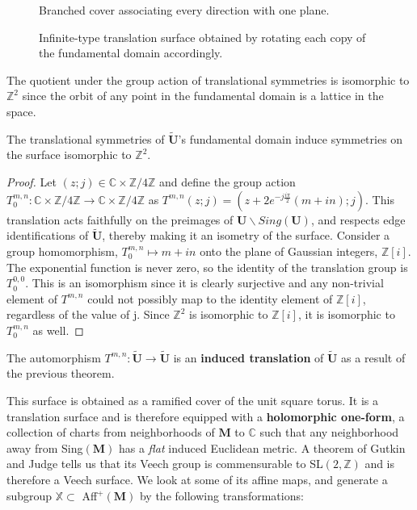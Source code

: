 \documentclass[]{article}
\begin{document}
\begin{figure}[H]
\centering

\label{fig:utilda0}
\caption{Branched cover associating every direction with one plane.}
\end{figure}

\begin{figure}[H]
\centering

\caption{Infinite-type translation surface obtained by rotating each copy of the fundamental domain accordingly.}
\label{fig:utilda}
\end{figure}

The quotient under the group action of translational symmetries is isomorphic to $\mathbb{Z}^2$ since the orbit of any point in the fundamental domain is a lattice in the space. 

\begin{thm}
The translational symmetries of $\tilde{\mathbf{U}}$'s fundamental domain induce symmetries on the surface isomorphic to $\mathbb{Z}^2$.
\begin{proof}
Let $(z;j)\in\mathbb{C}\times\mathbb{Z}/4\mathbb{Z}$ and define the group action $T_0^{m,n}:\mathbb{C}\times\mathbb{Z}/4\mathbb{Z}\rightarrow\mathbb{C}\times\mathbb{Z}/4\mathbb{Z}$ as $T^{m,n}(z;j)=(z+2e^{-j\frac{i\pi}{2}}(m+in);j)$. This translation acts faithfully on the preimages of $\mathbf{U}\backslash Sing(\mathbf{U})$, and respects edge identifications of $\mathbf{\tilde{\mathbf{U}}}$, thereby making it an isometry of the surface. Consider a group homomorphism, $T_0^{m,n}\mapsto m+in$ onto the plane of Gaussian integers, $\mathbb{Z}[i]$. The exponential function is never zero, so the identity of the translation group is $T_0^{0,0}$. This is an isomorphism since it is clearly surjective and any non-trivial element of $T^{m,n}$ could not possibly map to the identity element of $\mathbb{Z}[i]$, regardless of the value of j. Since $\mathbb{Z}^2$ is isomorphic to $\mathbb{Z}[i]$, it is isomorphic to  $T_0^{m,n}$ as well.
\end{proof}
\label{thm:z2}
\end{thm}


\begin{Def}
The automorphism $T^{m,n}:\tilde{\mathbf{U}}\rightarrow\tilde{\mathbf{U}}$ is an  \textbf{induced translation} of $\tilde{\mathbf{U}}$ as a result of the previous theorem.
\end{Def}




This surface is obtained as a ramified cover of the unit square torus. It is a translation surface and is therefore equipped with a \textbf{holomorphic one-form}, a collection of charts from neighborhoods of $\mathbf{M}$ to $\mathbb{C}$ such that any neighborhood away from Sing$(\mathbf{M})$ has a \emph{flat} induced Euclidean metric. A theorem of Gutkin and Judge tells us that its Veech group is commensurable to SL$(2,\mathbb{Z})$ and is therefore a Veech surface. We look at some of its affine maps, and generate a subgroup $\mathbb{X}\subset$ Aff$^+(\mathbf{M})$  by the following transformations:
\end{document}
